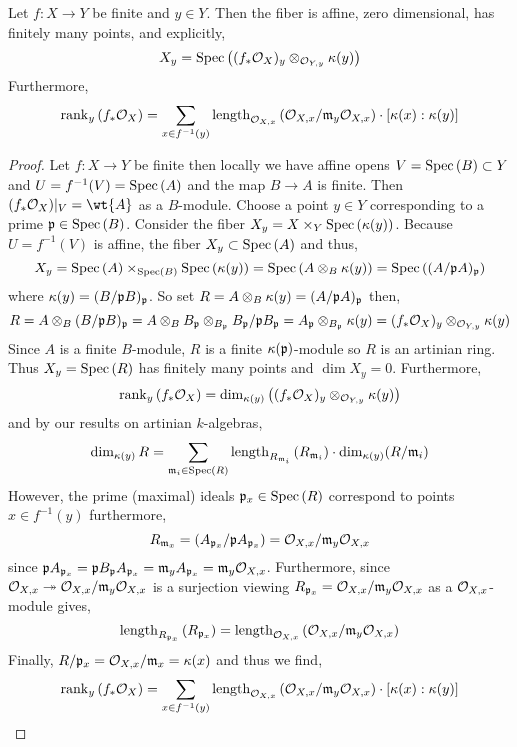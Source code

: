 \documentclass[12pt]{article}
\begin{document}
\begin{prop}
Let $f : X \to Y$ be finite and $y \in Y$. Then the fiber is affine, zero dimensional, has finitely many points, and explicitly,
\[ X_y = \mathrm{Spec}\left( (f_* \mathcal{O}_{X})_y \otimes_{\mathcal{O}_{Y, y}} \kappa(y) \right) \]
Furthermore,
\[ \operatorname{\mathrm{rank}}_y{(f_* \mathcal{O}_{X})} = \sum_{x \in f^{-1}(y)} \mathrm{length}_{\mathcal{O}_{X, x}}\left( \mathcal{O}_{X, x} / \mathfrak{m}_y \mathcal{O}_{X, x} \right) \cdot [\kappa(x) : \kappa(y)] \]
\end{prop}

\begin{proof}
Let $f : X \to Y$ be finite then locally we have affine opens $V = \mathrm{Spec}\left( B \right) \subset Y$ and $U = f^{-1}(V) = \mathrm{Spec}\left( A \right)$ and the map $B \to A$ is finite. Then $(f_* \struct{X})|_V = \wt{A}$ as a $B$-module. Choose a point $y \in Y$ corresponding to a prime $\mathfrak{p} \in \mathrm{Spec}\left( B \right)$.
Consider the fiber $X_y = X \times_{Y} \mathrm{Spec}\left( \kappa(y) \right)$. Because $U = f^{-1}(V)$ is affine, the fiber $X_y \subset \mathrm{Spec}\left( A \right)$ and thus,
\[ X_y = \mathrm{Spec}\left( A \right) \times_{\mathrm{Spec}\left( B \right)} \mathrm{Spec}\left( \kappa(y) \right) = \mathrm{Spec}\left( A \otimes_B \kappa(y) \right) = \mathrm{Spec}\left( (A / \mathfrak{p} A)_{\mathfrak{p}} \right) \]
where $\kappa(y) = (B / \mathfrak{p} B)_{\mathfrak{p}}$. So set $R = A \otimes_B \kappa(y) = (A / \mathfrak{p} A)_{\mathfrak{p}}$ then,
\[ R = A \otimes_B (B / \mathfrak{p} B)_{\mathfrak{p}} = A \otimes_B B_{\mathfrak{p}} \otimes_{B_{\mathfrak{p}}} B_{\mathfrak{p}} / \mathfrak{p} B_{\mathfrak{p}}  = A_{\mathfrak{p}} \otimes_{B_{\mathfrak{p}}} \kappa(y) = (f_* \mathcal{O}_{X})_y \otimes_{\mathcal{O}_{Y, y}} \kappa(y) \] 
Since $A$ is a finite $B$-module, $R$ is a finite $\kappa(\mathfrak{p})$-module so $R$ is an artinian ring. Thus $X_y = \mathrm{Spec}\left( R \right)$ has finitely many points and $\dim{X_y} = 0$. Furthermore,
\[ \operatorname{\mathrm{rank}}_y{(f_* \mathcal{O}_{X})} = \dim_{\kappa(y)} \left( (f_* \mathcal{O}_{X})_y \otimes_{\mathcal{O}_{Y, y}} \kappa(y) \right) \]
and by our results on artinian $k$-algebras,
\[ \dim_{\kappa(y)}{R} = \sum_{\mathfrak{m}_i \in \mathrm{Spec}\left( R \right)} \mathrm{length}_{R_{\mathfrak{m}_i}}\left( R_{\mathfrak{m}_i} \right) \cdot \dim_{\kappa(y)} (R / \mathfrak{m}_i) \]
However, the prime (maximal) ideals $\mathfrak{p}_x \in \mathrm{Spec}\left( R \right)$ correspond to points $x \in f^{-1}(y)$ furthermore,
\[ R_{\mathfrak{m}_x} = (A_{\mathfrak{p}_x} / \mathfrak{p} A_{\mathfrak{p}_x}) = \mathcal{O}_{X, x} / \mathfrak{m}_y \mathcal{O}_{X, x} \] since $\mathfrak{p} A_{\mathfrak{p}_x} = \mathfrak{p} B_{\mathfrak{p}} A_{\mathfrak{p}_x} = \mathfrak{m}_y A_{\mathfrak{p}_x} = \mathfrak{m}_y \mathcal{O}_{X, x}$. Furthermore, since $\mathcal{O}_{X, x} \twoheadrightarrow \mathcal{O}_{X, x} / \mathfrak{m}_y \mathcal{O}_{X, x}$ is a surjection viewing $R_{\mathfrak{p}_x} = \mathcal{O}_{X, x} / \mathfrak{m}_y \mathcal{O}_{X, x}$ as a $\mathcal{O}_{X, x}$-module gives,
\[ \mathrm{length}_{R_{\mathfrak{p}_x}}\left( R_{\mathfrak{p}_x} \right) = \mathrm{length}_{\mathcal{O}_{X, x}}\left( \mathcal{O}_{X, x} / \mathfrak{m}_y \mathcal{O}_{X, x} \right) \]
Finally, $R / \mathfrak{p}_x = \mathcal{O}_{X, x} / \mathfrak{m}_x = \kappa(x)$ and thus we find,
\[ \operatorname{\mathrm{rank}}_y{(f_* \mathcal{O}_{X})} = \sum_{x \in f^{-1}(y)} \mathrm{length}_{\mathcal{O}_{X, x}}\left( \mathcal{O}_{X, x} / \mathfrak{m}_y \mathcal{O}_{X, x} \right) \cdot [\kappa(x) : \kappa(y)] \]
\end{proof}
\end{document}
